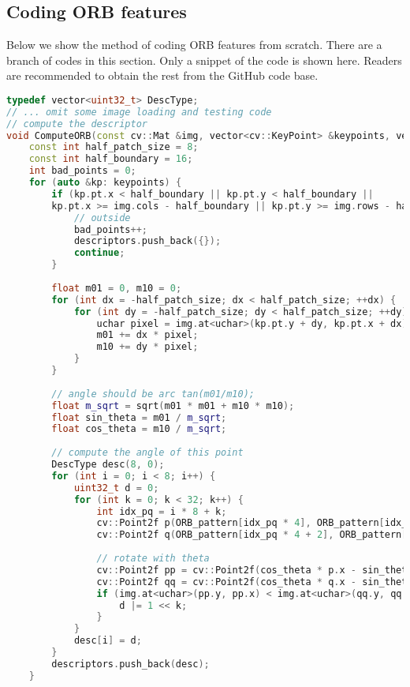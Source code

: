 \subsection{Coding ORB features}
Below we show the method of coding ORB features from scratch. There are a branch of codes in this section. Only a snippet of the code is shown here. Readers are recommended to obtain the rest from the GitHub code base.
\begin{lstlisting}[language=c++,caption=slambook2/ch7/orb_self.cpp（片段）]
typedef vector<uint32_t> DescType;
// ... omit some image loading and testing code
// compute the descriptor
void ComputeORB(const cv::Mat &img, vector<cv::KeyPoint> &keypoints, vector<DescType> &descriptors) {
    const int half_patch_size = 8;
    const int half_boundary = 16;
    int bad_points = 0;
    for (auto &kp: keypoints) {
        if (kp.pt.x < half_boundary || kp.pt.y < half_boundary ||
        kp.pt.x >= img.cols - half_boundary || kp.pt.y >= img.rows - half_boundary) {
            // outside
            bad_points++;
            descriptors.push_back({});
            continue;
        }
    
        float m01 = 0, m10 = 0;
        for (int dx = -half_patch_size; dx < half_patch_size; ++dx) {
            for (int dy = -half_patch_size; dy < half_patch_size; ++dy) {
                uchar pixel = img.at<uchar>(kp.pt.y + dy, kp.pt.x + dx);
                m01 += dx * pixel;
                m10 += dy * pixel;
            }
        }
    
        // angle should be arc tan(m01/m10);
        float m_sqrt = sqrt(m01 * m01 + m10 * m10);
        float sin_theta = m01 / m_sqrt;
        float cos_theta = m10 / m_sqrt;
        
        // compute the angle of this point
        DescType desc(8, 0);
        for (int i = 0; i < 8; i++) {
            uint32_t d = 0;
            for (int k = 0; k < 32; k++) {
                int idx_pq = i * 8 + k;
                cv::Point2f p(ORB_pattern[idx_pq * 4], ORB_pattern[idx_pq * 4 + 1]);
                cv::Point2f q(ORB_pattern[idx_pq * 4 + 2], ORB_pattern[idx_pq * 4 + 3]);
        
                // rotate with theta
                cv::Point2f pp = cv::Point2f(cos_theta * p.x - sin_theta * p.y, sin_theta * p.x + cos_theta * p.y) + kp.pt;
                cv::Point2f qq = cv::Point2f(cos_theta * q.x - sin_theta * q.y, sin_theta * q.x + cos_theta * q.y) + kp.pt;
                if (img.at<uchar>(pp.y, pp.x) < img.at<uchar>(qq.y, qq.x)) {
                    d |= 1 << k;
                }
            }
            desc[i] = d;
        }
        descriptors.push_back(desc);
    }
    

\end{lstlisting}
